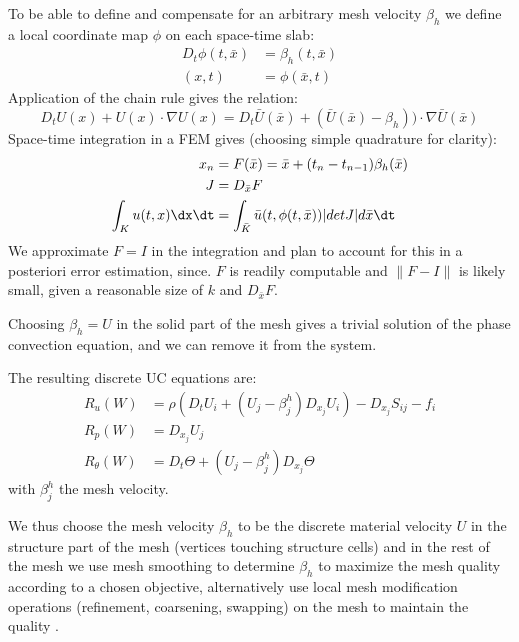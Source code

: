 To be able to define and compensate for an arbitrary mesh velocity
$\beta_h$ we define a local coordinate map $\phi$ on each space-time slab:
\begin{equation}
\begin{split}\label{eq:ALEmap}
D_t \phi(t, \bar{x}) &= \beta_h(t, \bar{x})
\\
(x, t) &= \phi(\bar{x}, t)
\end{split}
\end{equation}
Application of the chain rule gives the relation:
\begin{equation}
\label{eq:ALE2}
  D_t U(x) + U(x) \cdot \nabla U(x) = D_t \bar{U}(\bar{x}) +
  (\bar{U}(\bar{x}) - \beta_h)) \cdot \nabla \bar{U}(\bar{x})
\end{equation}
Space-time integration in a FEM gives (choosing simple quadrature for
clarity):
\begin{equation}
\begin{split}\label{eq:ALEFEM}
  x_n &= F(\bar{x}) = \bar{x} + (t_n - t_{n - 1})\beta_h(\bar{x})
\\
  J &= D_{\bar{x}} F
\\
  \int_{K} u(t, x) \dx\dt &= \int_{\bar{K}} \bar{u}(t, \phi(t, \bar{x})) |det J| d\bar{x}\dt
\end{split}
\end{equation}
We approximate $F = I$ in the integration and plan to account for this in
a posteriori error estimation, since. $F$ is readily computable and $\|F -
I\|$ is likely small, given a reasonable size of $k$ and $D_{\bar{x}} F$.

Choosing $\beta_h = U$ in the solid part of the mesh gives a trivial
solution of the phase convection equation, and we can remove it from
the system.

The resulting discrete UC equations are:
\begin{equation}
\begin{split}\label{eq:ALE}
R_u(W) &= \rho(D_t U_i + (U_j - \beta^h_j) D_{x_j} U_i) - D_{x_j} S_{ij} - f_i
\\
R_p(W) &= D_{x_j} U_j
\\
R_\theta(W) &= D_t \Theta + (U_j - \beta^h_j) D_{x_j} \Theta
\end{split}
\end{equation}
with $\beta^h_j$ the mesh velocity.

We thus choose the mesh velocity $\beta_h$ to be the discrete material
velocity $U$ in the structure part of the mesh (vertices touching
structure cells) and in the rest of the mesh we use mesh smoothing
to determine $\beta_h$ to maximize the mesh quality according to a
chosen objective, alternatively use local mesh modification operations
(refinement, coarsening, swapping) on the mesh to maintain the quality
\citep{Comp`ereRemacleJanssonEtAl2009}.

